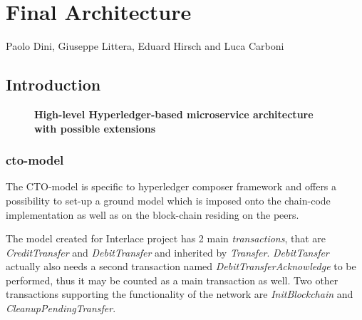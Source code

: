 \chapter{Final Architecture}
\label{ch:finarch}

\vspace{-1cm}
\begin{center}
Paolo Dini, Giuseppe Littera, Eduard Hirsch and Luca Carboni
\end{center}

\section{Introduction}


\begin{figure}[h]
\centering
{}
\caption{\bf \small High-level Hyperledger-based microservice architecture with possible extensions}
\label{fig:HL_Architecture}
\end{figure}








\subsection{cto-model}
\label{sec:cto-model}



The CTO-model is specific to hyperledger composer framework and offers a possibility to set-up a ground model which is imposed onto the chain-code implementation as well as on the block-chain residing on the peers. 

The model created for Interlace project has 2 main \textit{transactions}, that are \textit{CreditTransfer} and \textit{DebitTransfer} and inherited by \textit{Transfer}. \textit{DebitTansfer} actually also needs a second transaction named \textit{DebitTransferAcknowledge} to be performed, thus it may be counted as a main transaction as well. Two other transactions supporting the functionality of the network are \textit{InitBlockchain} and \textit{CleanupPendingTransfer}.

